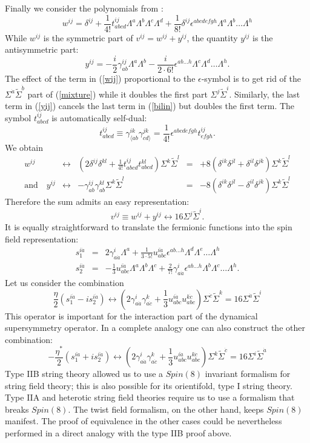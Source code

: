 \documentclass[nohyper,12pt,letterpaper]{JHEP3}
\def \tilde{\widetilde}
\def \lr{\leftrightarrow}
\def \eqn#1#2{\begin{equation}#2\label{#1}\end{equation}}
\def \da{{\dot a}}
\def \db{{\dot b}}
\def \dc{{\dot c}}
\def \tSigma{{\tilde \Sigma}}
\def\ar#1#2{\begin{array}{#1}#2\end{array}}
\begin{document}
Finally we consider the polynomials from \cite{brinkgs}:
\eqn{wij}{w^{ij}=\delta^{ij}+\frac{1}{4!}t^{ij}_{abcd}
\Lambda^a\Lambda^b\Lambda^c\Lambda^d+\frac{1}{8!}
\delta^{ij}\epsilon^{abcdefgh}
\Lambda^a\Lambda^b\dots
\Lambda^h}
While $w^{ij}$ is the symmetric part of $v^{ij}=w^{ij}+y^{ij}$,
the quantity $y^{ij}$ is the antisymmetric part:
\eqn{yij}{y^{ij}=-\frac{i}{2}\gamma^{ij}_{ab}\Lambda^a\Lambda^b
-\frac{i}{2\cdot 6!}
\epsilon^{ab\dots h}\Lambda^c\Lambda^d\dots\Lambda^h.}
The effect of the term in (\ref{wij}) proportional to the
$\epsilon$-symbol is to get rid of the $\Sigma^\da\tSigma^\db$
part of (\ref{mixture}) while it doubles
the first part
$\Sigma^j\tSigma^i$. Similarly, the last term in (\ref{yij})
cancels the last term in (\ref{bilin}) but doubles the first term.
The symbol $t^{ij}_{abcd}$ is automatically self-dual:
\eqn{selft}{t^{ij}_{abcd}\equiv \gamma^{ik}_{\langle ab}\gamma^{jk}_{cd\rangle}
=\frac{1}{4!}\epsilon^{abcdefgh}t^{ij}_{efgh}.}
We obtain
\eqn{wiji}{\begin{array}{rcccl}
{w^{ij}}&\lr& (2\delta^{ij}\delta^{kl}+\frac{1}{4!}
t^{ij}_{abcd}t^{kl}_{abcd})
\Sigma^k\tSigma^l&=&+8(\delta^{ik}\delta^{jl}+\delta^{il}\delta^{jk})\Sigma^{k}\tSigma^l
\\
\mbox{and}\quad
y^{ij} &\lr& - \gamma^{ij}_{ab}\gamma^{kl}_{ab}\Sigma^k\tSigma^l
&=&-8(\delta^{ik}\delta^{jl}-\delta^{il}\delta^{jk})\Sigma^{k}\tSigma^l\end{array}}
Therefore the sum admits an easy representation:
\eqn{vijresult}{v^{ij}\equiv w^{ij}+y^{ij} \lr 16\Sigma^j\tSigma^i.}
It is equally straightforward to translate the fermionic functions into the
spin field representation:
\eqn{spinove}{\ar{rcl}
{s_1^{i\da}&=&2\gamma^{i}_{a\da}\Lambda^a + \frac{1}{3\cdot 5!}
u^{i\da}_{abc}\epsilon^{ab\dots h}\Lambda^d\Lambda^e\dots \Lambda^h\\
s_2^{i\da}&=&-\frac 13 u^{i\da}_{abc}\Lambda^a\Lambda^b\Lambda^c
+\frac{2}{7!}\gamma^{i}_{a\da}\epsilon^{ab\dots h}\Lambda^b\Lambda^c
\dots\Lambda^h.}}
Let us consider the combination
\eqn{kombifer}{\frac\eta2(s_1^{i\da}-i s_2^{i\da})\lr
\left(2\gamma^{i}_{a\da}\gamma^{k}_{a\dc}
+\frac{1}3 u^{i\da}_{abc}u_{abc}^{k\dc}\right)\Sigma^{\dc}\tSigma^k
=16\Sigma^{\da}\tSigma^i
}
This operator is important for the interaction part of the dynamical
supersymmetry operator.
In a complete analogy one can also construct the other combination:
\eqn{kombiferr}{-\frac{\eta^*}2(s_1^{i\da}+i s_2^{i\da})\lr
\left(2\gamma^{i}_{a\da}\gamma^{k}_{a\dc}
+\frac{1}3 u^{i\da}_{abc}u_{abc}^{k\dc}\right)\Sigma^{k}\tSigma^\dc
=16\Sigma^{i}\tSigma^\da
}
Type IIB string theory allowed us to use a $Spin(8)$ invariant formalism 
for string field theory; this is also possible for its orientifold, type I 
string theory. Type IIA and heterotic string field theories require us to 
use a formalism that breaks $Spin(8)$. The twist field formalism, on the 
other hand, keeps $Spin(8)$ manifest. The proof of equivalence in the 
other cases could be nevertheless performed in a direct analogy with the 
type IIB proof above.
\end{document}
